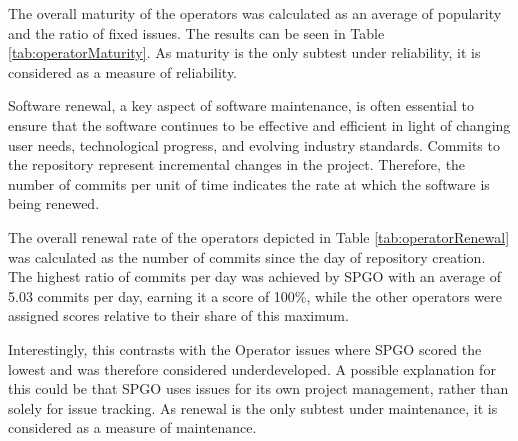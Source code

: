 
The overall maturity of the operators was calculated as an average of popularity and the ratio of fixed issues. The results can be seen in Table \ref{tab:operatorMaturity}. As maturity is the only subtest under reliability, it is considered as a measure of reliability.


Software renewal, a key aspect of software maintenance, is often essential to ensure that the software continues to be effective and efficient in light of changing user needs, technological progress, and evolving industry standards. Commits to the repository represent incremental changes in the project. Therefore, the number of commits per unit of time indicates the rate at which the software is being renewed.

The overall renewal rate of the operators depicted in Table \ref{tab:operatorRenewal} was calculated as the number of commits since the day of repository creation. The highest ratio of commits per day was achieved by SPGO with an average of 5.03 commits per day, earning it a score of 100\%, while the other operators were assigned scores relative to their share of this maximum.

Interestingly, this contrasts with the Operator issues where SPGO scored the lowest and was therefore considered underdeveloped. A possible explanation for this could be that SPGO uses issues for its own project management, rather than solely for issue tracking. As renewal is the only subtest under maintenance, it is considered as a measure of maintenance.



